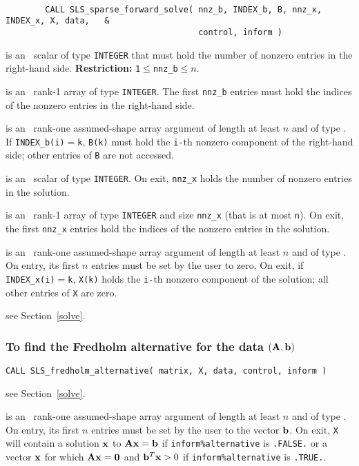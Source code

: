 \documentclass{galahad}
\newcommand{\packagename}{SLS}
\begin{document}
{\tt
\begin{verbatim}
        CALL SLS_sparse_forward_solve( nnz_b, INDEX_b, B, nnz_x, INDEX_x, X, data,   &
                                       control, inform )
\end{verbatim}
}
\vspace*{-4mm}
\begin{description}
 is an \intentin\ scalar of type  {\tt INTEGER} that
must hold the number of nonzero entries in the right-hand side.
{\bf Restriction:} {\tt 1$\le$nnz\_b$\le n$}.

  is an  \intentin\ rank-1 array of type {\tt INTEGER}.
The first {\tt nnz\_b} entries must hold the indices of the nonzero entries
in the right-hand side.

 is an  \intentin\ rank-one assumed-shape array argument of
length at least $n$ and of type \realdp.
If {\tt INDEX\_b(i)}$=${\tt k}, {\tt B(k)} must hold the {\tt i-}th
nonzero component of the right-hand side; other entries of {\tt B}
are not accessed.

  is an  \intentout\ scalar  of type  {\tt INTEGER}.
On exit, {\tt nnz\_x} holds the number of nonzero entries in the solution.

  is an  \intentout\ rank-1  array of type {\tt INTEGER} and
size {\tt nnz\_x} (that is at most {\tt n}). On exit, the first
{\tt nnz\_x} entries hold the indices of the nonzero entries in the solution.

 is an  \intentinout\ rank-one assumed-shape array argument of
length at least $n$ and of type \realdp.
On entry, its first $n$ entries must be set by the user to zero.
On exit, if {\tt INDEX\_x(i)}$=${\tt k}, {\tt X(k)} holds the {\tt i-}th
nonzero component of the solution; all other entries of {\tt X} are zero.

 see Section~\ref{solve}.

\end{description}

\subsubsection{To find the Fredholm alternative for the data $({\mathbf{A}},{\mathbf{b}})$}
\label{fredholm}

\hskip0.5in
{\tt CALL \packagename\_fredholm\_alternative( matrix, X, data, control,
 inform )}

\begin{description}

see Section~\ref{solve}.

 is an \intentinout\ rank-one assumed-shape array argument of
length at least $n$ and of type \realdp.
On entry, its first $n$ entries must be set by the user to the vector ${\mathbf{b}}$.
On exit, {\tt X} will contain a solution ${\mathbf{x}}$ to ${\mathbf{A}} {\mathbf{x}} = {\mathbf{b}}$ if
{\tt inform\%alternative} is {\tt .FALSE.} or a vector ${\mathbf{x}}$ for which
${\mathbf{A}} {\mathbf{x}} = {\mathbf{0}}$ and ${\mathbf{b}}^T {\mathbf{x}} > 0$ if
{\tt inform\%alternative} is {\tt .TRUE.}.
\end{description}
\end{document}
